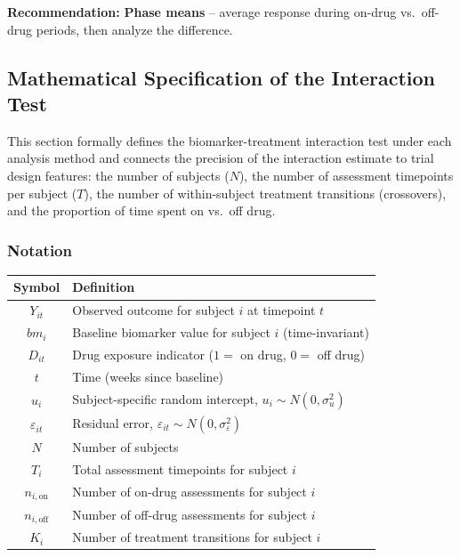 \documentclass[11pt,letterpaper]{article}
\begin{document}
\textbf{Recommendation:} \textbf{Phase means} -- average response during
on-drug vs.\ off-drug periods, then analyze the difference.


\subsection{Mathematical Specification of the Interaction Test}
\label{sec:mathspec}

This section formally defines the biomarker-treatment interaction test
under each analysis method and connects the precision of the interaction
estimate to trial design features: the number of subjects ($N$), the
number of assessment timepoints per subject ($T$), the number of
within-subject treatment transitions (crossovers), and the proportion of
time spent on vs.\ off drug.

\subsubsection{Notation}

\begin{table}[h]
\centering\small
\begin{tabular}{@{}cl@{}}
\toprule
Symbol & Definition \\
\midrule
$Y_{it}$ & Observed outcome for subject $i$ at timepoint $t$ \\
$bm_i$ & Baseline biomarker value for subject $i$ (time-invariant) \\
$D_{it}$ & Drug exposure indicator ($1 = $ on drug, $0 = $ off drug) \\
$t$ & Time (weeks since baseline) \\
$u_i$ & Subject-specific random intercept, $u_i \sim N(0, \sigma^2_u)$ \\
$\varepsilon_{it}$ & Residual error, $\varepsilon_{it} \sim N(0, \sigma^2_\varepsilon)$ \\
$N$ & Number of subjects \\
$T_i$ & Total assessment timepoints for subject $i$ \\
$n_{i,\text{on}}$ & Number of on-drug assessments for subject $i$ \\
$n_{i,\text{off}}$ & Number of off-drug assessments for subject $i$ \\
$K_i$ & Number of treatment transitions for subject $i$ \\
\bottomrule
\end{tabular}
\end{table}
\end{document}
